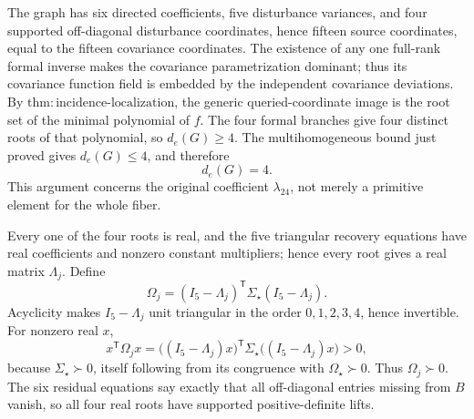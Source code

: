 The graph has six directed coefficients, five disturbance variances, and four supported off-diagonal disturbance coordinates, hence fifteen source coordinates, equal to the fifteen covariance coordinates. The existence of any one full-rank formal inverse makes the covariance parametrization dominant; thus its covariance function field is embedded by the independent covariance deviations. By \(\mathrm{thm:incidence\mbox{-}localization}\), the generic queried-coordinate image is the root set of the minimal polynomial of \(f\). The four formal branches give four distinct roots of that polynomial, so \(d_e(G)\ge4\). The multihomogeneous bound just proved gives \(d_e(G)\le4\), and therefore
\[
d_e(G)=4.
\]
This argument concerns the original coefficient \(\lambda_{24}\), not merely a primitive element for the whole fiber.

Every one of the four roots is real, and the five triangular recovery equations have real coefficients and nonzero constant multipliers; hence every root gives a real matrix \(\Lambda_j\). Define
\[
\Omega_j=(I_5-\Lambda_j)^{\mathsf T}\Sigma_\star(I_5-\Lambda_j).
\]
Acyclicity makes \(I_5-\Lambda_j\) unit triangular in the order \(0,1,2,3,4\), hence invertible. For nonzero real \(x\),
\[
x^{\mathsf T}\Omega_jx
=\bigl((I_5-\Lambda_j)x\bigr)^{\mathsf T}
\Sigma_\star\bigl((I_5-\Lambda_j)x\bigr)>0,
\]
because \(\Sigma_\star\succ0\), itself following from its congruence with \(\Omega_\star\succ0\). Thus \(\Omega_j\succ0\). The six residual equations say exactly that all off-diagonal entries missing from \(B\) vanish, so all four real roots have supported positive-definite lifts.

